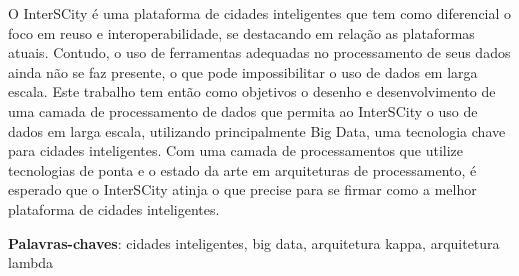 \begin{resumo}

O InterSCity é uma plataforma de cidades inteligentes que tem como
    diferencial o foco em reuso e interoperabilidade, se destacando em
    relação as plataformas atuais.
Contudo, o uso de ferramentas adequadas no processamento de seus dados ainda
    não se faz presente, o que pode impossibilitar o uso de dados em larga escala.
Este trabalho tem então como objetivos o desenho e desenvolvimento de uma
    camada de processamento de dados que permita ao InterSCity o uso de dados em
    larga escala, utilizando principalmente Big Data, uma tecnologia chave para
    cidades inteligentes.
Com uma camada de processamentos que utilize tecnologias de ponta e o estado
    da arte em arquiteturas de processamento, é esperado que o InterSCity
    atinja o que precise para se firmar como a melhor plataforma de cidades
    inteligentes.

 \vspace{\onelineskip}
    
 \noindent
 \textbf{Palavras-chaves}: cidades inteligentes, big data, arquitetura kappa, arquitetura lambda
\end{resumo}
